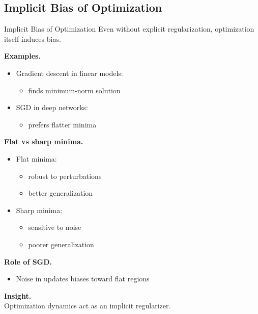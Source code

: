 \documentclass[aspectratio=169,11pt]{beamer}
\begin{document}
\subsection{Implicit Bias of Optimization}
\begin{frame}[t,allowframebreaks]{Implicit Bias of Optimization}
\small
Even without explicit regularization, optimization itself induces bias.

\textbf{Examples.}\\ \begin{itemize}
    \item Gradient descent in linear models:
    \begin{itemize}
        \item finds minimum-norm solution
    \end{itemize}

    \item SGD in deep networks:
    \begin{itemize}
        \item prefers flatter minima
    \end{itemize}
\end{itemize}

\textbf{Flat vs sharp minima.}\\ \begin{itemize}
    \item Flat minima:
    \begin{itemize}
        \item robust to perturbations
        \item better generalization
    \end{itemize}

    \item Sharp minima:
    \begin{itemize}
        \item sensitive to noise
        \item poorer generalization
    \end{itemize}
\end{itemize}

\textbf{Role of SGD.}\\ \begin{itemize}
    \item Noise in updates biases toward flat regions
\end{itemize}

\textbf{Insight.}\\ Optimization dynamics act as an implicit regularizer.
\end{frame}
\end{document}
